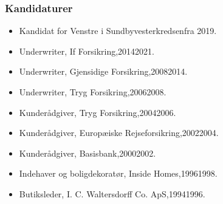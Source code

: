 \documentclass[11pt, a4paper]{awesome-cv}
\begin{document}
\begin{cvletter}
\subsubsection*{Kandidaturer}
\begin{itemize}
\item Kandidat for Venstre i Sundbyvesterkredsenfra 2019.
\end{itemize}
\begin{itemize}
\item Underwriter, If Forsikring,20142021.
\item Underwriter, Gjensidige Forsikring,20082014.
\item Underwriter, Tryg Forsikring,20062008.
\item Kunderådgiver, Tryg Forsikring,20042006.
\item Kunderådgiver, Europæiske Rejseforsikring,20022004.
\item Kunderådgiver, Basisbank,20002002.
\item Indehaver og boligdekoratør, Inside Homes,19961998.
\item Butiksleder, I. C. Waltersdorff  Co. ApS,19941996.
\end{itemize}
\end{cvletter}
\end{document}
